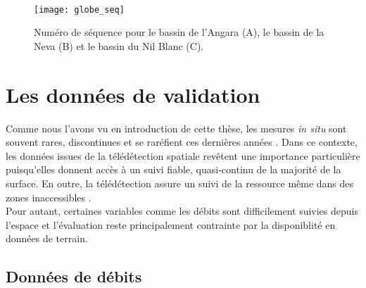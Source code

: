 ~\\

\begin{figure}[h!]
\centering
\texttt{[image: globe\_seq]}
\caption{Numéro de séquence pour le bassin de l'Angara (A), le bassin de la Neva (B) et le bassin du Nil Blanc (C).}
\label{globe_seq}
\end{figure}
\clearpage


\section{{\selectfont Les données de validation}}
\label{sec:donnees_globe}

Comme nous l'avons vu en introduction de cette thèse, les mesures \textit{in situ} sont souvent rares, discontinues et se raréfient ces dernières années \citep{duan2013}. Dans ce contexte, les données issues de la télédétection spatiale revêtent une importance particulière puisqu'elles donnent accès à un suivi fiable, quasi-continu de la majorité de la surface. En outre, la télédétection assure un suivi de la ressource même dans des zones inaccessibles \citep{avisse2017}.\\
Pour autant, certaines variables comme les débits sont difficilement suivies depuis l'espace et l'évaluation reste principalement contrainte par la disponiblité en données de terrain.
\subsection*{{\selectfont Données de débits}}
\label{sec:donnees_globe_debits}

